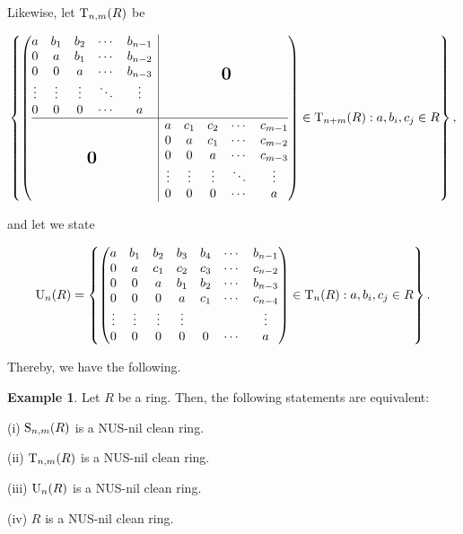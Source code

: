 \documentclass[12pt]{amsart}
\theoremstyle{definition}
\newtheorem{example}[theorem]{Example}
\newcommand{\bigzero}{\mbox{\normalfont\Large\bfseries 0}}
\begin{document}
\noindent Likewise, let ${\rm T}_{n,m}(R)$ be

$$\left\{ \left(\begin{array}{@{}c|c@{}}
  \begin{matrix}
  a & b_1 & b_2 & \cdots & b_{n-1} \\
  0 & a & b_1 & \cdots & b_{n-2} \\
  0 & 0 & a & \cdots & b_{n-3} \\
  \vdots & \vdots & \vdots & \ddots & \vdots \\
  0 & 0 & 0 & \cdots & a
  \end{matrix}
  & \bigzero \\
\hline
  \bigzero &
  \begin{matrix}
  a & c_1 & c_2 & \cdots & c_{m-1} \\
  0 & a & c_1 & \cdots & c_{m-2} \\
  0 & 0 & a & \cdots & c_{m-3} \\
  \vdots & \vdots & \vdots & \ddots & \vdots \\
  0 & 0 & 0 & \cdots & a
  \end{matrix}
\end{array}\right)\in {\rm T}_{n+m}(R) : a, b_i,c_j \in R \right\},$$

\noindent and let we state

$${\rm U}_{n}(R)=\left\{ \begin{pmatrix}
   a & b_1 & b_2 & b_3 & b_4 & \cdots & b_{n-1} \\
   0 & a & c_1 & c_2 & c_3 & \cdots & c_{n-2} \\
   0 & 0 & a & b_1 & b_2 & \cdots & b_{n-3} \\
   0 & 0 & 0 & a & c_1 & \cdots & c_{n-4} \\
   \vdots & \vdots & \vdots & \vdots &  &  & \vdots \\
   0 &0 & 0 & 0 & 0 & \cdots & a
\end{pmatrix}\in {\rm T}_{n}(R) :  a, b_i, c_j \in R \right\}.$$

Thereby, we have the following.

\begin{example}\label{exa3.29}
Let $R$ be a ring. Then, the following statements are equivalent:
\par
(i) ${\rm S}_{n,m}(R)$ is a NUS-nil clean ring.
\par
(ii) ${\rm T}_{n,m}(R)$ is a NUS-nil clean ring.
\par
(iii) ${\rm U}_{n}(R)$ is a NUS-nil clean ring.
\par
(iv) $R$ is a NUS-nil clean ring.
\end{example}
\end{document}
